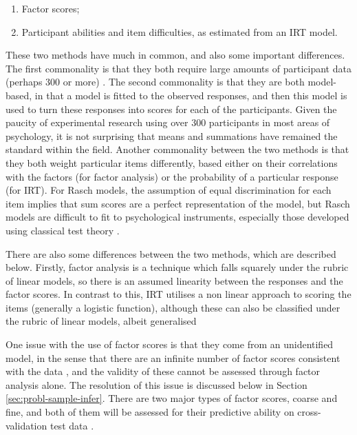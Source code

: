 \begin{enumerate}
\item Factor scores;
\item Participant abilities and item difficulties, as estimated from an IRT model.
\end{enumerate}

These two methods have much in common, and also some important differences. The first commonality is that they both require large amounts of participant data (perhaps 300 or more) \cite{van1997handbook,henson2006use}. The second commonality is that they are both model-based, in that a model is fitted to the observed responses, and then this model is used to turn these responses into scores for each of the participants. Given the paucity of experimental research using over 300 participants in most areas of psychology, it is not surprising that means and summations have remained the standard within the field. Another commonality between the two methods is that they both weight particular items differently, based either on their correlations with the factors (for factor analysis) or the probability of a particular response (for IRT). For Rasch models, the assumption of equal discrimination for each item implies that sum scores are a perfect representation of the model, but Rasch models are difficult to fit to psychological instruments, especially those developed using classical test theory \cite{borsboom2006attack}.   

There are also some differences between the two methods, which are described below. Firstly, factor analysis is a technique which falls squarely under the rubric of linear models\cite{venables2002modern}, so there is an assumed linearity between the responses and the factor scores. In contrast to this, IRT utilises a non linear approach to scoring the items (generally a logistic function), although these can also be classified under the rubric of linear models, albeit generalised \cite{venables2002modern}

One issue with the use of factor scores is that they come from an unidentified model, in the sense that there are an infinite number of factor scores consistent with the data \cite{grice2001computingit}, and the validity of these cannot be assessed through factor analysis alone. The resolution of this issue is discussed below in Section \ref{sec:probl-sample-infer}. There are two major types of factor scores, coarse and fine, and both of them will be assessed for their predictive ability on cross-validation test data \cite{grice2001computingit}.

